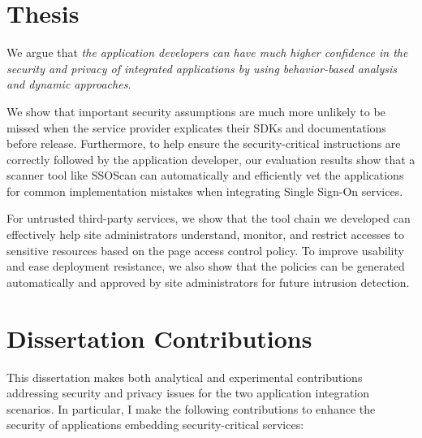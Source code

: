 \section{Thesis}

We argue that \emph{the application developers can have much higher confidence in the security and privacy of integrated applications by using behavior-based analysis and dynamic approaches}.  

We show that important security assumptions are much more unlikely to be missed when the service provider explicates their SDKs and documentations before release.  Furthermore, to help ensure the security-critical instructions are correctly followed by the application developer, our evaluation results show that a scanner tool like SSOScan can automatically and efficiently vet the applications for common implementation mistakes when integrating Single Sign-On services.  

For untrusted third-party services, we show that the tool chain we developed can effectively help site administrators understand, monitor, and restrict accesses to sensitive resources based on the page access control policy.  To improve usability and ease deployment resistance, we also show that the policies can be generated automatically and approved by site administrators for future intrusion detection.

\section{Dissertation Contributions}  

This dissertation makes both analytical and experimental contributions addressing security and privacy issues for the two application integration scenarios.  In particular, I make the following contributions to enhance the security of applications embedding security-critical services:

